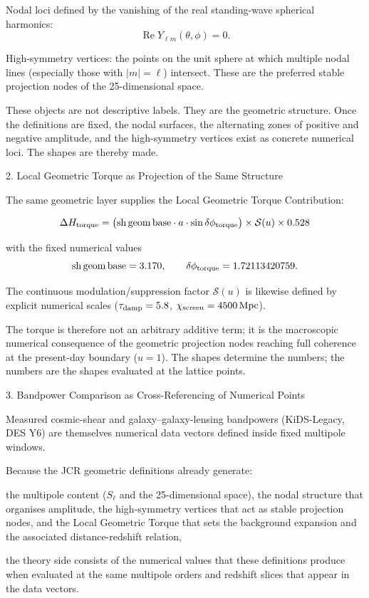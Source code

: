 Nodal loci defined by the vanishing of the real standing-wave spherical harmonics:
  \[
  \operatorname{Re}Y_{\ell m}(\theta,\phi)=0.
  \]

High-symmetry vertices: the points on the unit sphere at which multiple nodal lines (especially those with \(|m|=\ell\)) intersect. These are the preferred stable projection nodes of the 25-dimensional space.

These objects are not descriptive labels. They are the geometric structure. Once the definitions are fixed, the nodal surfaces, the alternating zones of positive and negative amplitude, and the high-symmetry vertices exist as concrete numerical loci. The shapes are thereby made.

2. Local Geometric Torque as Projection of the Same Structure

The same geometric layer supplies the Local Geometric Torque Contribution:

\[
\Delta H_{\rm torque}=\bigl({\rm sh\,geom\,base}\cdot a\cdot\sin\delta\phi_{\rm torque}\bigr)\times\mathcal{S}(u)\times0.528
\]

with the fixed numerical values  
\[
{\rm sh\,geom\,base}=3.170,\qquad\delta\phi_{\rm torque}=1.72113420759.
\]

The continuous modulation/suppression factor \(\mathcal{S}(u)\) is likewise defined by explicit numerical scales (\(\tau_{\rm damp}=5.8\), \(\chi_{\rm screen}=4500\,\mathrm{Mpc}\)).  

The torque is therefore not an arbitrary additive term; it is the macroscopic numerical consequence of the geometric projection nodes reaching full coherence at the present-day boundary (\(u=1\)). The shapes determine the numbers; the numbers are the shapes evaluated at the lattice points.

3. Bandpower Comparison as Cross-Referencing of Numerical Points

Measured cosmic-shear and galaxy–galaxy-lensing bandpowers (KiDS-Legacy, DES Y6) are themselves numerical data vectors defined inside fixed multipole windows.  

Because the JCR geometric definitions already generate:

the multipole content (\(S_\ell\) and the 25-dimensional space),
the nodal structure that organises amplitude,
the high-symmetry vertices that act as stable projection nodes,
and the Local Geometric Torque that sets the background expansion and the associated distance-redshift relation,

the theory side consists of the numerical values that these definitions produce when evaluated at the same multipole orders and redshift slices that appear in the data vectors.

